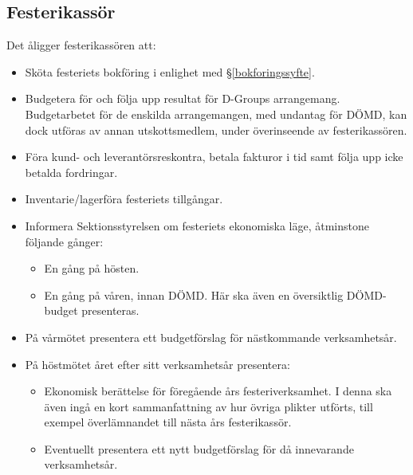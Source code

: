 \documentclass{datateknologsektionen-document}
\begin{document}
\subsection{Festerikassör}
\label{festerikassor}
Det åligger festerikassören att:
\begin{itemize}
  \item Sköta festeriets bokföring i enlighet med \S \ref{bokforingssyfte}.
  \item Budgetera för och följa upp resultat för D-Groups arrangemang. Budgetarbetet för de enskilda arrangemangen, med undantag för DÖMD, kan dock utföras av annan utskottsmedlem, under överinseende av festerikassören.
  \item Föra kund- och leverantörsreskontra, betala fakturor i tid samt följa upp icke betalda fordringar.
  \item Inventarie/lagerföra festeriets tillgångar.
  \item Informera Sektionsstyrelsen om festeriets ekonomiska läge, åtminstone följande gånger:
  \begin{itemize}
    \item En gång på hösten.
    \item En gång på våren, innan DÖMD. Här ska även en översiktlig DÖMD-budget presenteras.
  \end{itemize}
  \item På vårmötet presentera ett budgetförslag för nästkommande verksamhetsår.
  \item På höstmötet året efter sitt verksamhetsår presentera:
  \begin{itemize}
    \item Ekonomisk berättelse för föregående års festeriverksamhet. I denna ska även ingå en kort sammanfattning av hur övriga plikter utförts, till exempel överlämnandet till nästa års festerikassör.
    \item Eventuellt presentera ett nytt budgetförslag för då innevarande verksamhetsår.
  \end{itemize}
\end{itemize}
\end{document}
